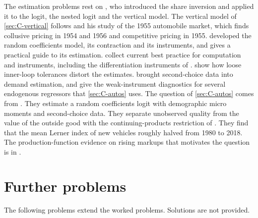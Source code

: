 The estimation problems rest on \citet{Berry1994}, who introduced the share inversion and applied it to the logit,
the nested logit and the vertical model. The vertical model of \cref{sec:C-vertical} follows \citet{Bresnahan1987}
and his study of the 1955 automobile market, which finds collusive pricing in 1954 and 1956 and competitive pricing in
1955. \citet{BerryLevinsohnPakes1995} developed the random coefficients model, its
contraction and its instruments, and \citet{Nevo2000a} gives a practical guide to its estimation.
\citet{ConlonGortmaker2020} collect current best practice for computation and instruments, including the
differentiation instruments of \citet{GandhiHoude2019}. \citet{DubeFoxSu2012} show how loose inner-loop tolerances
distort the estimates. \citet{BerryLevinsohnPakes2004} brought second-choice data into demand estimation, and
\citet{SandersonWindmeijer2016} give the weak-instrument diagnostics for several endogenous regressors that
\cref{sec:C-autos} uses. The question of \cref{sec:C-autos} comes from \citet{GriecoMurryYurukoglu2024}. They estimate
a random coefficients logit with demographic micro moments and second-choice data. They separate unobserved quality
from the value of the outside good with the continuing-products restriction of \citet{PakesBerryLevinsohn1993}. They
find that the mean Lerner index of new vehicles roughly halved from 1980 to 2018. The production-function evidence on rising markups that motivates the question is in \citet{DeLoeckerEeckhoutUnger2020}.

\section{Further problems}\label{sec:C-further}

The following problems extend the worked problems. Solutions are not provided.

